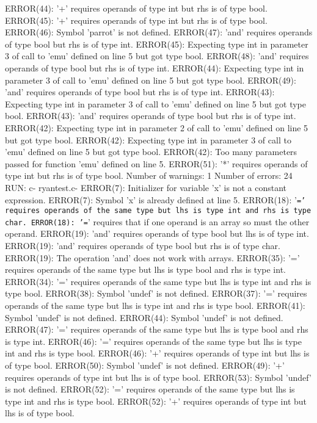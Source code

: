 \documentclass[12pt]{book}
\begin{document}
ERROR(44): '+' requires operands of type int but rhs is of type bool.
ERROR(45): '+' requires operands of type int but rhs is of type bool.
ERROR(46): Symbol 'parrot' is not defined.
ERROR(47): 'and' requires operands of type bool but rhs is of type int.
ERROR(45): Expecting type int in parameter 3 of call to 'emu' defined on line 5 but got type bool.
ERROR(48): 'and' requires operands of type bool but rhs is of type int.
ERROR(44): Expecting type int in parameter 3 of call to 'emu' defined on line 5 but got type bool.
ERROR(49): 'and' requires operands of type bool but rhs is of type int.
ERROR(43): Expecting type int in parameter 3 of call to 'emu' defined on line 5 but got type bool.
ERROR(43): 'and' requires operands of type bool but rhs is of type int.
ERROR(42): Expecting type int in parameter 2 of call to 'emu' defined on line 5 but got type bool.
ERROR(42): Expecting type int in parameter 3 of call to 'emu' defined on line 5 but got type bool.
ERROR(42): Too many parameters passed for function 'emu' defined on line 5.
ERROR(51): '*' requires operands of type int but rhs is of type bool.
Number of warnings: 1
Number of errors: 24
RUN: c- ryantest.c-
ERROR(7): Initializer for variable 'x' is not a constant expression.
ERROR(7): Symbol 'x' is already defined at line 5.
ERROR(18): '\texttt{=' requires operands of the same type but lhs is type int and rhs is type char.
ERROR(18): '=}' requires that if one operand is an array so must the other operand.
ERROR(19): 'and' requires operands of type bool but lhs is of type int.
ERROR(19): 'and' requires operands of type bool but rhs is of type char.
ERROR(19): The operation 'and' does not work with arrays.
ERROR(35): '=' requires operands of the same type but lhs is type bool and rhs is type int.
ERROR(34): '=' requires operands of the same type but lhs is type int and rhs is type bool.
ERROR(38): Symbol 'undef' is not defined.
ERROR(37): '=' requires operands of the same type but lhs is type int and rhs is type bool.
ERROR(41): Symbol 'undef' is not defined.
ERROR(44): Symbol 'undef' is not defined.
ERROR(47): '=' requires operands of the same type but lhs is type bool and rhs is type int.
ERROR(46): '=' requires operands of the same type but lhs is type int and rhs is type bool.
ERROR(46): '+' requires operands of type int but lhs is of type bool.
ERROR(50): Symbol 'undef' is not defined.
ERROR(49): '+' requires operands of type int but lhs is of type bool.
ERROR(53): Symbol 'undef' is not defined.
ERROR(52): '=' requires operands of the same type but lhs is type int and rhs is type bool.
ERROR(52): '+' requires operands of type int but lhs is of type bool.
\end{document}
